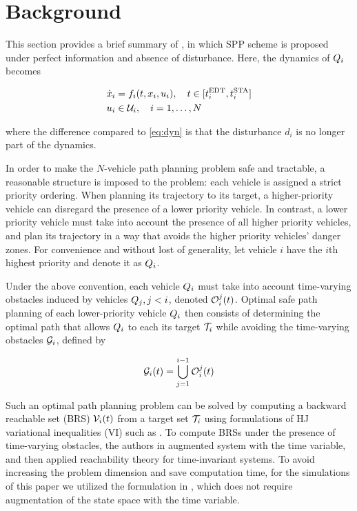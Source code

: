 \section{Background \label{sec:background}}
This section provides a brief summary of \cite{Chen15}, in which SPP scheme is proposed under perfect information and absence of disturbance. Here, the dynamics of $Q_i$ becomes

\begin{equation}
\label{eq:dyn_no_dstb}
\begin{aligned}
\dot{x}_i &= f_i(t, x_i, u_i), \quad t \in [t^\text{EDT}_i, t^\text{STA}_i] \\
u_i &\in \mathcal{U}_i, \quad i = 1,\ldots, N
\end{aligned}
\end{equation}

\noindent where the difference compared to \eqref{eq:dyn} is that the disturbance $d_i$ is no longer part of the dynamics.

In order to make the $N$-vehicle path planning problem safe and tractable, a reasonable structure is imposed to the problem: each vehicle is assigned a strict priority ordering. When planning its trajectory to its target, a higher-priority vehicle can disregard the presence of a lower priority vehicle. In contrast, a lower priority vehicle must take into account the presence of all higher priority vehicles, and plan its trajectory in a way that avoids the higher priority vehicles' danger zones. For convenience and without lost of generality, let vehicle $i$ have the $i$th highest priority and denote it as $Q_i$. 

Under the above convention, each vehicle $Q_i$ must take into account time-varying obstacles induced by vehicles $Q_j, j<i$, denoted $\mathcal{O}_i^j(t)$. Optimal safe path planning of each lower-priority vehicle $Q_i$ then consists of determining the optimal path that allows $Q_i$ to each its target $\mathcal{T}_i$ while avoiding the time-varying obstacles $\mathcal{G}_i$, defined by

\begin{equation}
\label{eq:ioset}
\mathcal{G}_i(t) = \bigcup_{j=1}^{i-1}\mathcal{O}_i^j(t)
\end{equation}

Such an optimal path planning problem can be solved by computing a backward reachable set (BRS) $\mathcal{V}_i(t)$ from a target set $\mathcal{T}_i$ using formulations of HJ variational inequalities (VI) such as \cite{Barron90, Bokanowski10, Bokanowski11, Fisac15}. To compute BRSs under the presence of time-varying obstacles, the authors in \cite{Bokanowski11} augmented system with the time variable, and then applied reachability theory for time-invariant systems. To avoid increasing the problem dimension and save computation time, for the simulations of this paper we utilized the formulation in \cite{Fisac15}, which does not require augmentation of the state space with the time variable.

